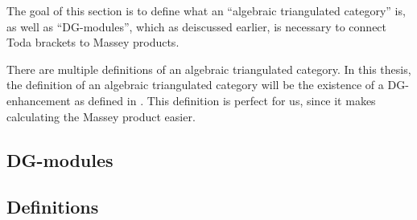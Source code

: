 The goal of this section is to define what an ``algebraic triangulated category'' is, as well as ``DG-modules'', which as deiscussed earlier, is necessary to connect Toda brackets to Massey products.

There are multiple definitions of an algebraic triangulated category. In this thesis, the definition of an algebraic triangulated category will be the existence of a DG-enhancement as defined in \cite[Definition 3.1.3]{Jasso-Muro_2023}. This definition is perfect for us, since it makes calculating the Massey product easier.

\subsection{DG-modules}


\subsection{Definitions}

